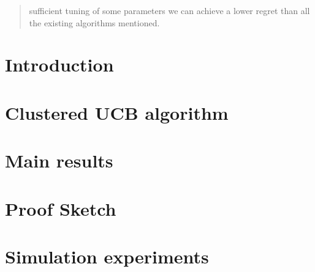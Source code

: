 \documentclass[twoside]{article}
\begin{document}
\begin{abstract}

sufficient tuning of some parameters we can achieve a lower regret than all the existing algorithms mentioned.
\end{abstract}

\section{Introduction}
\label{sec:intro}


\section{Clustered UCB algorithm}
\label{sec:clusucb}


\section{Main results}
\label{sec:results}


\section{Proof Sketch}
\label{sec:proofSketch}


\section{Simulation experiments}
\label{sec:expts}

\end{document}
